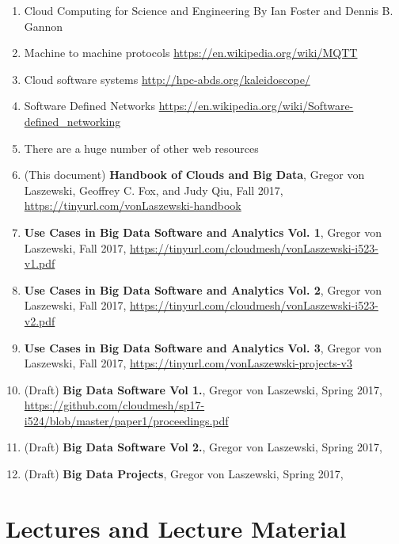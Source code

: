 \begin{enumerate}
\item Cloud Computing for Science and Engineering By Ian Foster and
  Dennis
  B. Gannon
\item	Machine to machine protocols \url{https://en.wikipedia.org/wiki/MQTT}
\item	Cloud software systems \url{http://hpc-abds.org/kaleidoscope/}
\item	Software Defined Networks \url{https://en.wikipedia.org/wiki/Software-defined_networking}
\item	There are a huge number of other web resources

\item (This document) {\bf Handbook of Clouds and Big Data}, Gregor von Laszewski,
  Geoffrey C. Fox, and Judy Qiu, Fall 2017,
  \url{https://tinyurl.com/vonLaszewski-handbook}

\item {\bf Use Cases in Big Data Software and
  Analytics Vol. 1}, Gregor von Laszewski, Fall 2017,
  \url{https://tinyurl.com/cloudmesh/vonLaszewski-i523-v1.pdf}

\item {\bf Use Cases in Big Data Software and
  Analytics Vol. 2}, Gregor von Laszewski, Fall 2017, \url{https://tinyurl.com/cloudmesh/vonLaszewski-i523-v2.pdf}

\item  {\bf Use Cases in Big Data Software and
  Analytics Vol. 3}, Gregor von Laszewski, Fall 2017,   
  \url{https://tinyurl.com/vonLaszewski-projects-v3}

\item (Draft) {\bf Big Data Software Vol 1.}, Gregor von Laszewski, Spring 2017,
\url{https://github.com/cloudmesh/sp17-i524/blob/master/paper1/proceedings.pdf}

\item (Draft) {\bf Big Data Software Vol 2.}, Gregor von Laszewski, Spring 2017,

\item (Draft) {\bf Big Data Projects}, Gregor von Laszewski, Spring 2017,

\end{enumerate}


\section{Lectures and Lecture Material}\label{S:lectures-616}

